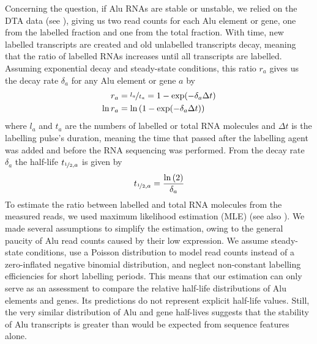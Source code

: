 Concerning\label{mar:alumle} the question,
if Alu RNAs are stable or unstable, we relied on the DTA data (see
), giving us two read counts for each Alu
element or gene, one from the labelled fraction and one from the total
fraction. With time, new labelled transcripts are created and old unlabelled
transcripts decay, meaning that the ratio of labelled RNAs increases until all
transcripts are labelled. Assuming exponential decay and steady-state
conditions, this ratio $r_{a}$ gives us the decay rate $\delta{}_{a}$ for any
Alu element or gene $a$ by
\begin{align*}
       r_{a} &= \nicefrac{l_{a}}{t_{a}}=1-\exp(-\delta_{a}\Delta t)
\\ \ln r_{a} &= \ln\left(1-\exp(-\delta_{a}\Delta t)\right)
\end{align*}
where $l_{a}$ and $t_{a}$ are the numbers of labelled or total RNA molecules
and $\Delta{}t$ is the labelling pulse’s duration, meaning the time that
passed after the labelling agent was added and before the RNA sequencing was
performed. From the decay rate $\delta{}_{a}$ the half-life
$t_{\nicefrac{1}{2},a}$ is given by
\begin{align*}
t_{\nicefrac{1}{2},a}=\frac{\ln\left(2\right)}{\delta_{a}}
\end{align*}
To estimate the ratio between labelled and total RNA molecules from the
measured reads, we used maximum likelihood estimation (MLE) \citep{Rossi2018}
(see also ). We made several assumptions to simplify
the estimation, owing to the general paucity of Alu read counts caused by
their low expression. We assume steady-state conditions, use a Poisson
distribution to model read counts instead of a zero-inflated negative binomial
distribution, and neglect non-constant labelling efficiencies for short
labelling periods. This means that our estimation can only serve as an
assessment to compare the relative half-life distributions of Alu elements and
genes. Its predictions do not represent explicit half-life values. Still, the
very similar distribution of Alu and gene half-lives suggests that the
stability of Alu transcripts is greater than would be expected from sequence
features alone.
\bigbreak


